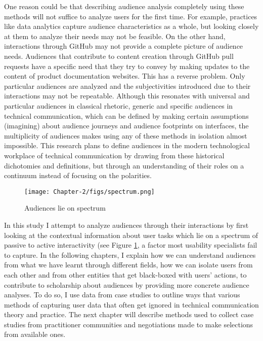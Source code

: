 One reason could be that describing audience analysis completely using these methods will not suffice to analyze users for the first time. For example, practices like data analytics capture audience characteristics as a whole, but looking closely at them to analyze their needs may not be feasible. On the other hand, interactions through GitHub may not provide a complete picture of audience needs. Audiences that contribute to content creation through GitHub pull requests have a specific need that they try to convey by making updates to the content of product documentation websites. This has a reverse problem. Only particular audiences are analyzed and the subjectivities introduced due to their interactions may not be repeatable. Although this resonates with universal and particular audiences in classical rhetoric, generic and specific audiences in technical communication, which can be defined by making certain assumptions (imagining) about audience journeys and audience footprints on interfaces, the multiplicity of audiences makes using any of these methods in isolation almost impossible. This research plans to define audiences in the modern technological workplace of technical communication by drawing from these historical dichotomies and definitions, but through an understanding of their roles on a continuum instead of focusing on the polarities.

\begin{figure}[t]
    \begin{center}
        \texttt{[image: Chapter-2/figs/spectrum.png]}
    \end{center}
    \caption{Audiences lie on spectrum}
    \label{fig:ch2.2}
\end{figure}

In this study I attempt to analyze audiences through their interactions by first looking at the contextual information about user tasks which lie on a spectrum of passive to active interactivity (see Figure \ref{fig:ch2.2}, a factor most usability specialists fail to capture. In the following chapters, I explain how we can understand audiences from what we have learnt through different fields, how we can isolate users from each other and from other entities that get black-boxed with users' actions, to contribute to scholarship about audiences by providing more concrete audience analyses. To do so, I use data from case studies to outline ways that various methods of capturing user data that often get ignored in technical communication theory and practice. The next chapter will describe methods used to collect case studies from practitioner communities and negotiations made to make selections from available ones.
